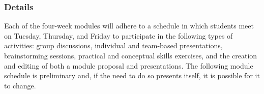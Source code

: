 \subsubsection*{Details}

Each of the four-week modules will adhere to a schedule in which students meet on Tuesday, Thursday, and Friday to
participate in the following types of activities: group discussions, individual and team-based presentations,
brainstorming sessions, practical and conceptual skills exercises, and the creation and editing of both a module
proposal and presentations.  The following module schedule is preliminary and, if the need to do so presents itself, it
is possible for it to change. 


\vspace*{.2in}
\hspace*{-.75in}
